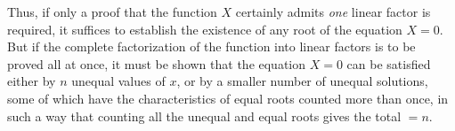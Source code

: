 Thus, if only a proof that the function $X$ certainly admits \textit{one} linear factor is required, it suffices to establish the existence of any root of the equation $X=0$. But if the complete factorization of the function into linear factors is to be proved all at once, it must be shown that the equation $X=0$ can be satisfied either by $n$ unequal values of $x$, or by a smaller number of unequal solutions, some of which have the characteristics of equal roots counted more than once, in such a way that counting all the unequal and equal roots gives the total $=n$.

